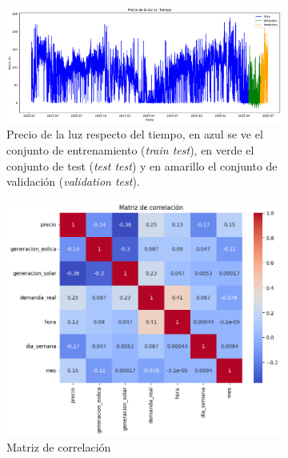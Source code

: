 \begin{figure}[H]
\centering
\begin{subfigure}[b]{0.7\textwidth}
\centering
\includegraphics[width=\textwidth]{figuras/historico_precios.png}
\caption[Precio de la luz respecto del tiempo]{Precio de la luz respecto del tiempo, en azul se ve el conjunto de entrenamiento (\textit{train test}), en verde el conjunto de test (\textit{test test}) y en amarillo el conjunto de validación (\textit{validation test}).}
\label{Precio vs tiempo}
\end{subfigure}
\begin{subfigure}[b]{0.6\textwidth}
\centering
\includegraphics[width=\textwidth]{figuras/matriz_correlacion.png}
\caption[Matriz de correlación]{Matriz de correlación}
\label{Matriz de correlacion}
\end{subfigure}
\begin{subfigure}[b]{0.4\textwidth}
\centering

\end{subfigure}
\end{figure}

